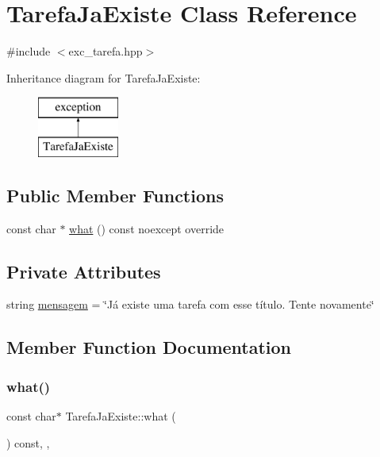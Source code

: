 \hypertarget{classTarefaJaExiste}{}\section{Tarefa\+Ja\+Existe Class Reference}
\label{classTarefaJaExiste}


{\ttfamily \#include $<$exc\+\_\+tarefa.\+hpp$>$}

Inheritance diagram for Tarefa\+Ja\+Existe\+:\begin{figure}[H]
\begin{center}
\leavevmode
\includegraphics[height=2.000000cm]{classTarefaJaExiste}
\end{center}
\end{figure}
\subsection*{Public Member Functions}
\begin{DoxyCompactItemize}
\item 
const char $\ast$ \hyperlink{classTarefaJaExiste_a22f1eadc9e9c35239fc2bc529e3effc5}{what} () const noexcept override
\end{DoxyCompactItemize}
\subsection*{Private Attributes}
\begin{DoxyCompactItemize}
\item 
string \hyperlink{classTarefaJaExiste_a29db5b452baf0e27ee2fa9f14c683ed0}{mensagem} = \char`\"{}Já existe uma tarefa com esse título. Tente novamente\char`\"{}
\end{DoxyCompactItemize}


\subsection{Member Function Documentation}
\mbox{\label{classTarefaJaExiste_a22f1eadc9e9c35239fc2bc529e3effc5}} 
\subsubsection{\texorpdfstring{what()}{what()}}
{\footnotesize\ttfamily const char$\ast$ Tarefa\+Ja\+Existe\+::what (\begin{DoxyParamCaption}{ }\end{DoxyParamCaption}) const\hspace{0.3cm}{\ttfamily [inline]}, {\ttfamily [override]}, {\ttfamily [noexcept]}}



